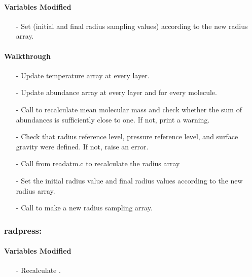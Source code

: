 \documentclass[letterpaper,12pt]{article}
\begin{document}
\paragraph{Variables Modified}
\begin{enumerate}[leftmargin=10pt, noitemsep, parsep=0pt, topsep=0ex]
\item[-] Set  (initial and final radius sampling values) according to the new radius array.
\end{enumerate}

\paragraph{Walkthrough}
\begin{enumerate}[leftmargin=10pt, noitemsep, parsep=0pt, topsep=0ex]
\item[-] Update temperature array at every layer.
\item[-] Update abundance array at every layer and for every molecule.
\item[-] Call  to recalculate mean molecular mass and check whether the sum of abundances is sufficiently close to one. If not, print a warning.
\item[-] Check that radius reference level, pressure reference level, and surface gravity were defined. If not, raise an error.
\item[-] Call  from readatm.c to recalculate the radius array
\item[-] Set the initial radius value and final radius values according to the new radius array.
\item[-] Call  to make a new radius sampling array.
\end{enumerate}

\subsubsection{radpress:}
\paragraph{Variables Modified}
\begin{enumerate}[leftmargin=10pt, noitemsep, parsep=0pt, topsep=0ex]
\item[-] Recalculate .
\end{enumerate}
\end{document}

